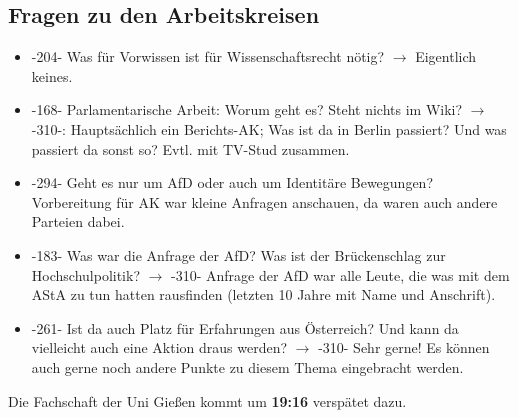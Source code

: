   \subsection{Fragen zu den Arbeitskreisen}
    \begin{itemize}
      \item -204- Was für Vorwissen ist für Wissenschaftsrecht nötig? $\rightarrow$ Eigentlich keines.
      \item -168- Parlamentarische Arbeit: Worum geht es? Steht nichts im Wiki? $\rightarrow$ -310-: Hauptsächlich ein Berichts-AK; Was ist da in Berlin passiert? Und was passiert da sonst so? Evtl. mit TV-Stud zusammen.
      \item -294- Geht es nur um AfD oder auch um Identitäre Bewegungen? Vorbereitung für AK war kleine Anfragen anschauen, da waren auch andere Parteien dabei.
      \item -183- Was war die Anfrage der AfD? Was ist der Brückenschlag zur Hochschulpolitik? $\rightarrow$ -310- Anfrage der AfD war alle Leute, die was mit dem AStA zu tun hatten rausfinden (letzten 10 Jahre mit Name und Anschrift).
      \item -261- Ist da auch Platz für Erfahrungen aus Österreich? Und kann da vielleicht auch eine Aktion draus werden? $\rightarrow$ -310- Sehr gerne! Es können auch gerne noch andere Punkte zu diesem Thema eingebracht werden.
    \end{itemize}

    \begin{info}{}
      Die Fachschaft der Uni Gießen kommt um \textbf{19:16} verspätet dazu.
    \end{info}

